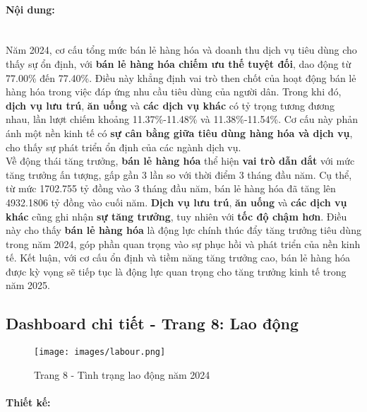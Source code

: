 \documentclass[a4paper]{report}
\begin{document}
{{\paragraph{Nội dung: } \mbox{}\\

Năm 2024, cơ cấu tổng mức bán lẻ hàng hóa và doanh thu dịch vụ tiêu dùng cho thấy sự ổn định, với \textbf{bán lẻ hàng hóa chiếm ưu thế tuyệt đối}, dao động từ 77.00\% đến 77.40\%. Điều này khẳng định vai trò then chốt của hoạt động bán lẻ hàng hóa trong việc đáp ứng nhu cầu tiêu dùng của người dân. Trong khi đó, \textbf{dịch vụ lưu trú}, \textbf{ăn uống} và \textbf{các dịch vụ khác} có tỷ trọng tương đương nhau, lần lượt chiếm khoảng 11.37\%-11.48\% và 11.38\%-11.54\%. Cơ cấu này phản ánh một nền kinh tế có \textbf{sự cân bằng giữa tiêu dùng hàng hóa và dịch vụ}, cho thấy sự phát triển ổn định của các ngành dịch vụ.\\

Về động thái tăng trưởng, \textbf{bán lẻ hàng hóa} thể hiện \textbf{vai trò dẫn dắt} với mức tăng trưởng ấn tượng, gấp gần 3 lần so với thời điểm 3 tháng đầu năm. Cụ thể, từ mức 1702.755 tỷ đồng vào 3 tháng đầu năm, bán lẻ hàng hóa đã tăng lên 4932.1806 tỷ đồng vào cuối năm. \textbf{Dịch vụ lưu trú}, \textbf{ăn uống} và \textbf{các dịch vụ khác} cũng ghi nhận \textbf{sự tăng trưởng}, tuy nhiên với \textbf{tốc độ chậm hơn}. Điều này cho thấy \textbf{bán lẻ hàng hóa} là động lực chính thúc đẩy tăng trưởng tiêu dùng trong năm 2024, góp phần quan trọng vào sự phục hồi và phát triển của nền kinh tế. Kết luận, với cơ cấu ổn định và tiềm năng tăng trưởng cao, bán lẻ hàng hóa được kỳ vọng sẽ tiếp tục là động lực quan trọng cho tăng trưởng kinh tế trong năm 2025.

\newpage
\subsection{Dashboard chi tiết - Trang 8: Lao động}

\begin{figure}[H]
    \centering
    \texttt{[image: images/labour.png]}
    \caption{Trang 8 - Tình trạng lao động năm 2024}
    \label{fig:enter-label}
\end{figure}

\paragraph{Thiết kế: } \mbox{}\\

}}
\end{document}
